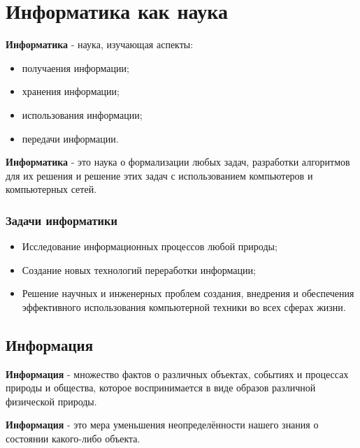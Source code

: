 
\section{Информатика как наука}

\begin{definition}
  \textbf{Информатика} - наука, изучающая аспекты:
  \begin{itemize}
    \item получаения информации;
    \item хранения информации;
    \item использования информации;
    \item передачи информации.
  \end{itemize}
\end{definition}

\begin{definition}
  \textbf{Информатика} - это наука о формализации любых задач, разработки алгоритмов для их решения и решение этих задач с использованием компьютеров и компьютерных сетей.
\end{definition}

\subsubsection*{Задачи информатики}

\begin{itemize}
  \item Исследование информационных процессов любой природы;
  \item Создание новых технологий переработки информации;
  \item Решение научных и инженерных проблем создания, внедрения и обеспечения эффективного использования компьютерной техники во всех сферах жизни.
\end{itemize}

\subsection{Информация}

\begin{definition}
  \textbf{Информация} - множество фактов о различных объектах, событиях и процессах природы и общества, которое воспринимается в виде образов различной физической природы.
\end{definition}

\begin{definition}
  \textbf{Информация} - это мера уменьшения неопределённости нашего знания о состоянии какого-либо объекта.
\end{definition}


